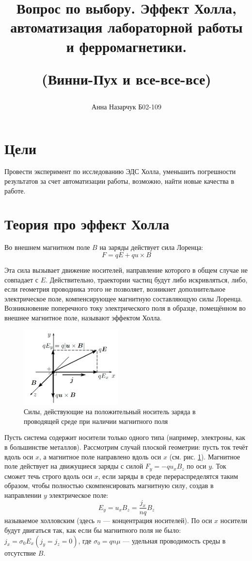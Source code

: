 \documentclass[a4paper,12pt]{article} %
\author{Анна Назарчук Б02-109}
\title{Вопрос по выбору. Эффект Холла, автоматизация лабораторной работы и ферромагнетики. 

\textcolor[gray]{0.4}{(Винни-Пух и все-все-все)}}
\date{}
\begin{document}
\maketitle
\section{Цели}
Провести эксперимент по исследованию ЭДС Холла, уменьшить погрешности результатов за счет автоматизации работы, возможно, найти новые качества в работе. 

\section{Теория про эффект Холла}

Во внешнем магнитном поле $B$ на заряды действует сила Лоренца:
\begin{equation}
F = qE+qu\times B
\end{equation}

Эта сила вызывает движение носителей, направление которого в общем
случае не совпадает с $E$. Действительно, траектории частиц будут либо
искривляться, либо, если геометрия проводника этого не позволяет,
возникнет дополнительное электрическое поле, компенсирующее магнитную
составляющую силы Лоренца. Возникновение поперечного току
электрического поля в образце, помещённом во внешнее магнитное поле,
называют \textsf{эффектом Холла}.

\begin{figure}[h!]
\begin{center}
\includegraphics[width=0.46\textwidth]{Teor}
\caption{Силы, действующие на положительный носитель заряда в проводящей
среде при наличии магнитного поля} \label{силы}
\end{center}
\end{figure}

Пусть система содержит носители только одного типа (например,
электроны, как в большинстве металлов). Рассмотрим случай плоской геометрии: пусть ток течёт вдоль оси $x$, а магнитное поле направлено вдоль оси $x$ (см. рис. \ref{силы}). Магнитное поле действует на движущиеся заряды с силой $F_y=-qu_xB_z$ по оси $y$. Ток сможет
течь строго вдоль оси $x$, если заряды в среде перераспределятся таким
образом, чтобы полностью скомпенсировать магнитную силу, создав в
направлении $y$ электрическое поле:
\begin{equation}
\label{E_y}
E_y=u_xB_z=\dfrac{j_x}{nq}B_z
\end{equation}
называемое \textsf{холловским} (здесь $n$ — концентрация носителей). По оси
$x$ носители будут двигаться так, как если бы магнитного поля не было:
$j_x=\sigma_0 E_x (j_y = j_z = 0)$, где $\sigma_0 = qn\mu$ — удельная проводимость среды в отсутствие $B$.
\end{document}
